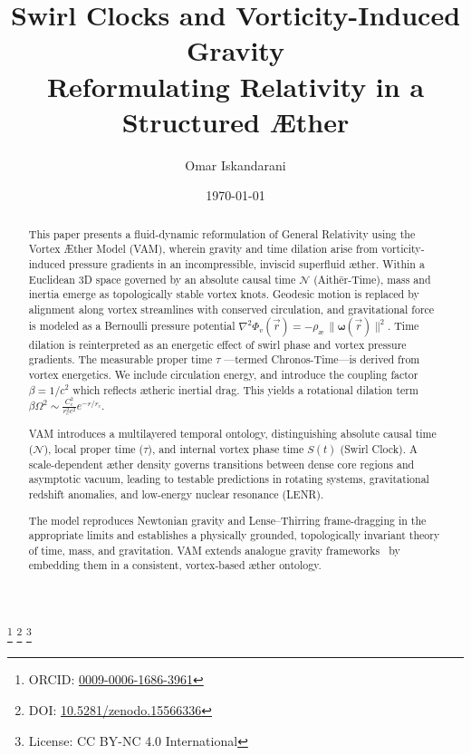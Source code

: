 \documentclass[preprint]{revtex4-2}
\newcommand{\paperdoi}{10.5281/zenodo.15566336}
\begin{document}
\title{Swirl Clocks and Vorticity-Induced Gravity\\[0.25em]
\large Reformulating Relativity in a Structured Æther}

\author{Omar Iskandarani}
\thanks{ORCID: \href{https://orcid.org/0009-0006-1686-3961}{0009-0006-1686-3961}}
\thanks{DOI: \href{https://doi.org/\paperdoi}{\paperdoi}}
\thanks{License: CC BY-NC 4.0 International}

\date{\today}


    \begin{abstract}
        This paper presents a fluid-dynamic reformulation of General Relativity using the Vortex Æther Model (VAM), wherein gravity and time
        dilation arise from vorticity-induced pressure gradients in an incompressible, inviscid superfluid æther. Within a Euclidean 3D space
        governed by an absolute causal time $\mathcal{N}$ (Aithēr-Time), mass and inertia emerge as topologically stable vortex knots. Geodesic motion is replaced by alignment along vortex streamlines with conserved circulation, and gravitational force is modeled as a Bernoulli pressure potential \( \nabla^2 \Phi_v(\vec{r}) = -\rho_\text{\ae} \, \|\boldsymbol{\omega}(\vec{r})\|^2  \).
        Time dilation is reinterpreted as an energetic effect of swirl phase and vortex pressure gradients. The measurable proper time $\tau$
        —termed Chronos-Time—is derived from vortex energetics.
        We include circulation energy, and introduce the coupling factor $\beta = 1/c^2$ which reflects ætheric inertial drag. This yields a rotational dilation term $\beta \Omega^2 \sim \frac{C_e^2}{r_c^2 c^2} e^{-r/r_c}$.

        VAM introduces a multilayered temporal ontology, distinguishing absolute causal time ($\mathcal{N}$), local proper time ($\tau$), and internal vortex phase time $S(t)$ (Swirl Clock). A scale-dependent æther density governs transitions between dense core regions and asymptotic vacuum, leading to testable predictions in rotating systems, gravitational redshift anomalies, and low-energy nuclear resonance (LENR).

        The model reproduces Newtonian gravity and Lense–Thirring frame-dragging in the appropriate limits and establishes a physically grounded, topologically invariant theory of time, mass, and gravitation. VAM extends analogue gravity frameworks~\cite{barcelo2011analogue, volovik2009universe} by embedding them in a consistent, vortex-based æther ontology.
    \end{abstract}
    \maketitle
    \vfill
\end{document}
